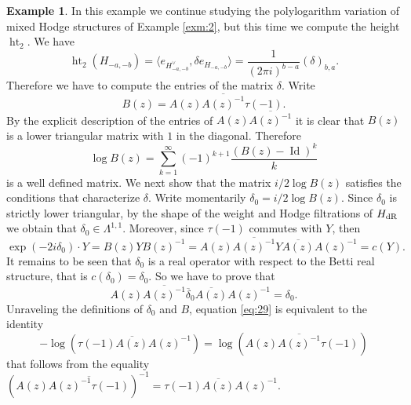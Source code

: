 \documentclass[11pt,a4paper]{amsart}
\newcommand{\dR}{\text{\rm dR}}
\DeclareMathOperator{\Id}{Id}
\DeclareMathOperator{\Ht}{ht}
\numberwithin{equation}{section}
\theoremstyle{plain}
\theoremstyle{definition}
\newtheorem{ex}[prop]{Example}
\begin{document}
\begin{ex}\label{exm:14}
  In this example we continue studying the polylogarithm variation of
  mixed Hodge structures of Example \ref{exm:2}, but this time we
  compute the height $\Ht_{2}$. We have
  \begin{displaymath}
    \Ht_{2}(H_{-a,-b})=\langle e_{H^{\vee}_{-a,-b}},\delta
    e_{H_{-a,-b}}\rangle = \frac{1}{(2\pi i)^{b-a}} (\delta )_{b,a}.
  \end{displaymath}
  Therefore we have to compute the entries of the matrix $\delta
  $. Write
  \begin{displaymath}
    B(z)=A(z)\overline {A(z)^{-1}} \tau (-1).
  \end{displaymath}
  By the explicit description of the entries of $A(z)\overline
  {A(z)^{-1}}$ it is clear that $B(z)$ is a lower triangular matrix
  with $1$ in the diagonal. Therefore
  \begin{displaymath}
    \log B(z)=\sum _{k=1}^{\infty}(-1)^{k+1}\frac{(B(z)-\Id)^{k}}{k}
  \end{displaymath}
  is a well defined matrix. We next show that the matrix $i/2 \log
  B(z)$ satisfies the conditions that characterize $\delta $. Write
  momentarily $\delta _{0}=i/2 \log B(z)$. Since $\delta _{0}$ is
  strictly lower triangular, by the shape of the weight and Hodge
  filtrations of
  $H_{\dR}$ we obtain that $\delta _{0}\in \Lambda ^{1,1}$.
  Moreover, since $\tau (-1)$ commutes with $Y$, then 
  \begin{displaymath}
    \exp(-2i\delta _{0})\cdot Y=B(z)Y B(z)^{-1}= A(z)\overline {A(z)^{-1}}
    Y \overline {A(z)}A(z)^{-1}=c(Y).
  \end{displaymath}
  It remains to be seen that $\delta _{0}$ is a real operator with
  respect to the Betti real structure, that is
  $c(\delta _{0})=\delta _{0}$.
  So we have to prove that
  \begin{equation}\label{eq:29}
    A(z)\overline {A(z)^{-1}}
    \overline \delta _{0} \overline {A(z)}A(z)^{-1}=\delta _{0}.
  \end{equation}
  Unraveling the definitions of $\delta _{0}$ and $B$, equation
  \eqref{eq:29} is equivalent to the  identity
  \begin{displaymath}
    -\log(\tau (-1)\overline{A(z)}A(z)^{-1})=
    \log(A(z)\overline{A(z)^{-1}}\tau (-1))
  \end{displaymath}
  that follows from the equality $(A(z)\overline{A(z)^{-1}\tau
    (-1)})^{-1}=\tau (-1)\overline{A(z)}A(z)^{-1}$. 


\end{ex}
\end{document}
